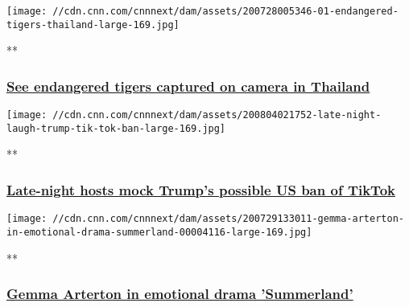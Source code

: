 \href{/videos/world/2020/07/28/endangered-tigers-thailand-lon-orig-tp.cnn/video/playlists/trending-video/}{}

\texttt{[image: //cdn.cnn.com/cnnnext/dam/assets/200728005346-01-endangered-tigers-thailand-large-169.jpg]}

**

\hypertarget{see-endangered-tigers-captured-on-camera-in-thailand}{%
\subsubsection{\texorpdfstring{\href{/videos/world/2020/07/28/endangered-tigers-thailand-lon-orig-tp.cnn/video/playlists/trending-video/}{See
endangered tigers captured on camera in
Thailand}}{See endangered tigers captured on camera in Thailand}}\label{see-endangered-tigers-captured-on-camera-in-thailand}}

\href{/videos/media/2020/08/04/late-night-laughs-trump-tik-tok-ban-orig.cnn/video/playlists/trending-video/}{}

\texttt{[image: //cdn.cnn.com/cnnnext/dam/assets/200804021752-late-night-laugh-trump-tik-tok-ban-large-169.jpg]}

**

\hypertarget{late-night-hosts-mock-trumps-possible-us-ban-of-tiktok}{%
\subsubsection{\texorpdfstring{\href{/videos/media/2020/08/04/late-night-laughs-trump-tik-tok-ban-orig.cnn/video/playlists/trending-video/}{Late-night
hosts mock Trump's possible US ban of
TikTok}}{Late-night hosts mock Trump's possible US ban of TikTok}}\label{late-night-hosts-mock-trumps-possible-us-ban-of-tiktok}}

\href{/videos/movies/2020/07/29/gemma-arterton-in-emotional-drama-summerland.cnn/video/playlists/trending-video/}{}

\texttt{[image: //cdn.cnn.com/cnnnext/dam/assets/200729133011-gemma-arterton-in-emotional-drama-summerland-00004116-large-169.jpg]}

**

\hypertarget{gemma-arterton-in-emotional-drama-summerland}{%
\subsubsection{\texorpdfstring{\href{/videos/movies/2020/07/29/gemma-arterton-in-emotional-drama-summerland.cnn/video/playlists/trending-video/}{Gemma
Arterton in emotional drama
'Summerland'}}{Gemma Arterton in emotional drama 'Summerland'}}\label{gemma-arterton-in-emotional-drama-summerland}}


